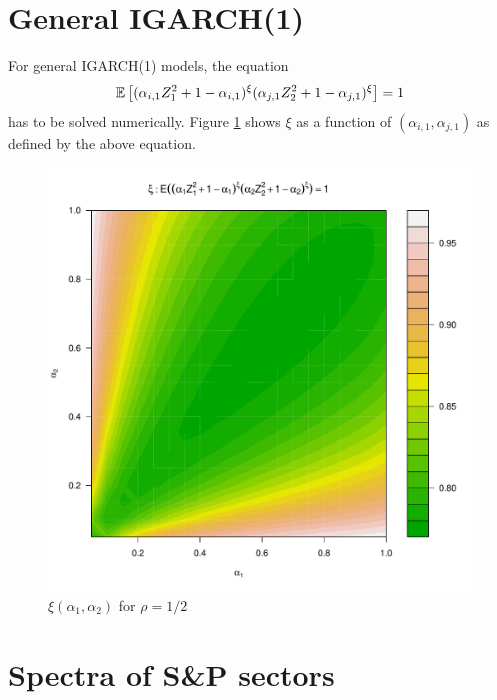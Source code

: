 \documentclass{article}
\begin{document}
\section{General IGARCH(1)}
For general IGARCH(1) models, the equation
\begin{equation*}
  \mathbb{E} \left[
    (
    \alpha_{i,1} Z_1^2 + 1 - \alpha_{i,1}
    )^\xi
    (
    \alpha_{j,1} Z_2^2 + 1 - \alpha_{j,1}
    )^\xi\right] = 1
\end{equation*}
has to be solved numerically. Figure \ref{fig:xi_rho0.5} shows $\xi$
as a function of $(\alpha_{i,1}, \alpha_{j,1})$ as defined by the
above equation.
\begin{figure}[htb!]
  \centering
  \includegraphics[scale=0.4]{igarch_rho0dot5.pdf}
  \caption{$\xi(\alpha_1, \alpha_2)$ for $\rho = 1/2$}
  \label{fig:xi_rho0.5}
\end{figure}

\section{Spectra of S\&P sectors}
\end{document}
